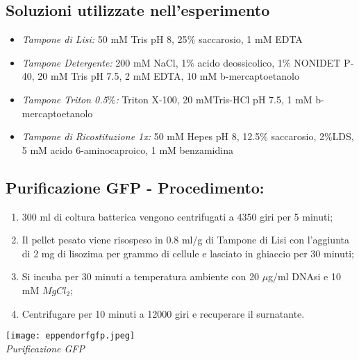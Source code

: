 \documentclass{extarticle}
\begin{document}
\subsection*{Soluzioni utilizzate nell'esperimento}
\begin{itemize}
    \item \textit{Tampone di Lisi:} 50 mM Tris pH 8, 25$\%$ saccarosio, 1 mM EDTA
    \item \textit{Tampone Detergente:} 200 mM NaCl, 1$\%$ acido deossicolico, 1$\%$ NONIDET P-40, 20 mM Tris pH 7.5, 2 mM EDTA, 10 mM b-mercaptoetanolo
    \item \textit{Tampone Triton 0.5$\%$:} Triton X-100, 20 mMTris-HCl pH 7.5, 1 mM b-mercaptoetanolo
    \item \textit{Tampone di Ricostituzione 1x:} 50 mM Hepes pH 8, 12.5$\%$ saccarosio, 2$\%$LDS, 5 mM acido 6-aminocaproico, 1 mM benzamidina
\end{itemize}
\begin{minipage}{0.50 \textwidth}
    \subsection*{Purificazione GFP - Procedimento:}
    \begin{enumerate}
        \item 300 ml di coltura batterica  vengono centrifugati a 4350 giri per 5 minuti;
        \item Il pellet pesato viene risospeso in 0.8 ml/g di Tampone di Lisi con l'aggiunta di 2 mg di lisozima per grammo di cellule e lasciato in ghiaccio per 30 minuti; 
        \item Si incuba per 30 minuti a temperatura ambiente con 20 $\mu$g/ml DNAsi e 10 mM $MgCl_{2}$;
        \item Centrifugare per 10 minuti a 12000 giri e recuperare il surnatante. 
    \end{enumerate}
\end{minipage} \hfill
\begin{minipage}{0.50 \textwidth}
    \begin{center}
        \texttt{[image: eppendorfgfp.jpeg]}\\
        \emph{Purificazione GFP}
    \end{center}
\end{minipage}
\end{document}
